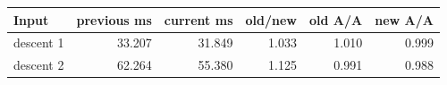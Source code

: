 \begin{center}
\small
\begin{tabular}{lrrrrr}
\toprule
Input & previous ms & current ms & old/new & old A/A & new A/A\\
\midrule
descent 1 & 33.207 & 31.849 & 1.033 & 1.010 & 0.999\\
descent 2 & 62.264 & 55.380 & 1.125 & 0.991 & 0.988\\
\bottomrule
\end{tabular}
\end{center}
